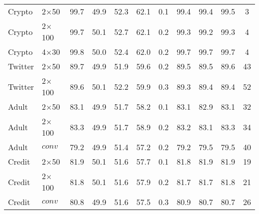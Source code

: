 {\begin{table}[t]
\begin{center}
\begin{tabular}{lll cccc cccc}
\midrule
Crypto   & 2$\times$50    &  99.7   &   49.9   & 52.3   & 62.1     &  0.1 &   99.4    &  99.4   & 99.5     &  3          \\ 
Crypto   & 2$\times$100   &  99.7   &   50.1   &  52.7   & 62.1       & 0.2 &   99.3   &  99.2   & 99.3       & 4      \\   
Crypto   & 4$\times$30    &  99.8   &    50.0 &   52.4 &   62.0       & 0.2 &    99.7 &   99.7 &   99.7       & 4        \\     
\midrule
Twitter   & 2$\times$50   &  89.7   &     49.9   &   51.9  & 59.6    &  0.2 &     89.5   &   89.5  &  89.6    &  43        \\  
Twitter   & 2$\times$100  &  89.6       &   50.1   &  52.2   &  59.9      &   0.3 &   89.3   &  89.4   &  89.4      &   52       \\ 
\midrule
Adult   & 2$\times$50     &  83.1       &   49.9  &  51.7   & 58.2        &    0.1  &   83.1  &  82.9   & 83.1        &    32   \\     

Adult   & 2$\times$100    &  83.3        &   49.9  & 51.7    & 58.9        &   0.2  &   83.2  & 83.1    & 83.3        &   34     \\ 

Adult   & $conv$          &  79.2        &   49.9  &  51.4   & 57.2        &  0.2   &   79.2  &  79.5   & 79.5        &  40    \\ 
\midrule
Credit   & 2$\times$50    &  81.9          &  50.1    &   51.6  & 57.7       & 0.1    &  81.8    &   81.9  & 81.9       & 19    \\ 
Credit   & 2$\times$100   &  81.8         &   50.1   &   51.6  &  57.9      &  0.2  &   81.7   &   81.7  &  81.8      &  21   \\ 
Credit   & $conv$         &  80.8          &    49.9  &   51.6  & 57.5       & 0.3  &    80.9  &   80.7  & 80.7       & 26   \\   
\bottomrule        
\end{tabular}
    \label{tab:results3}
\quad
\end{center}
\end{table} 

}
